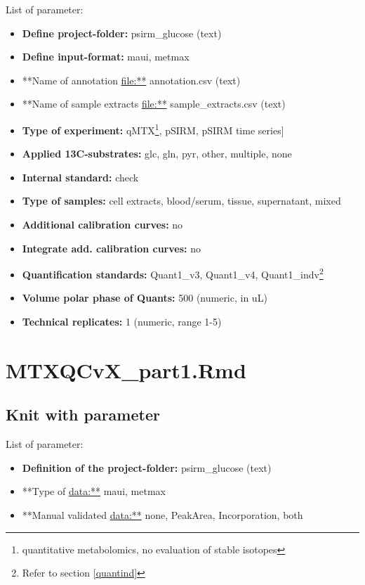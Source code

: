 \documentclass[]{book}
\providecommand{\tightlist}{%
  \setlength{\itemsep}{0pt}\setlength{\parskip}{0pt}}
\let\rmarkdownfootnote\footnote%
\def\footnote{\protect\rmarkdownfootnote}
\theoremstyle{definition}
\theoremstyle{definition}
\theoremstyle{definition}
\theoremstyle{remark}
\begin{document}
List of parameter:

\begin{itemize}
\tightlist
\item
  \textbf{Define project-folder:} psirm\_glucose (text)
\item
  \textbf{Define input-format:} maui, metmax
\item
  **Name of annotation \url{file:**} annotation.csv (text)
\item
  **Name of sample extracts \url{file:**} sample\_extracts.csv (text)
\item
  \textbf{Type of experiment:} qMTX\footnote{quantitative metabolomics,
    no evaluation of stable isotopes}, pSIRM, pSIRM time series{]}
\item
  \textbf{Applied 13C-substrates:} glc, gln, pyr, other, multiple, none
\item
  \textbf{Internal standard:} check
\item
  \textbf{Type of samples:} cell extracts, blood/serum, tissue,
  supernatant, mixed
\item
  \textbf{Additional calibration curves:} no
\item
  \textbf{Integrate add. calibration curves:} no
\item
  \textbf{Quantification standards:} Quant1\_v3, Quant1\_v4,
  Quant1\_indv\footnote{Refer to section \ref{quantind}}
\item
  \textbf{Volume polar phase of Quants:} 500 (numeric, in uL)
\item
  \textbf{Technical replicates:} 1 (numeric, range 1-5)
\end{itemize}

\chapter{MTXQCvX\_part1.Rmd}\label{part1}

\section{Knit with parameter}\label{knit-with-parameter-2}

List of parameter:

\begin{itemize}
\tightlist
\item
  \textbf{Definition of the project-folder:} psirm\_glucose (text)
\item
  **Type of \url{data:**} maui, metmax
\item
  **Manual validated \url{data:**} none, PeakArea, Incorporation, both
\end{itemize}
\end{document}
